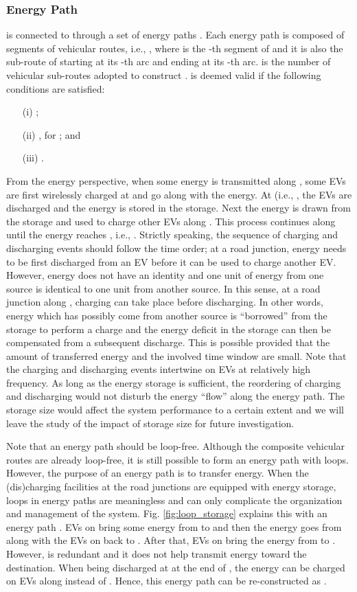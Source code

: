 \documentclass[journal]{IEEEtran}
\begin{document}
\subsubsection{Energy Path}
 is connected to  through a set of energy paths . Each energy path  is composed of  segments of vehicular routes, i.e., , where  is the -th segment of  and it is also the sub-route of  starting at its -th arc and ending at its -th arc.  is  the number of vehicular sub-routes adopted to construct .  is deemed valid if the following conditions are satisfied:
\begin{enumerate}
	\item[(i)] ;
	\item[(ii)] , for  \mbox{}; and
	\item[(iii)] .
\end{enumerate}
From the energy perspective, when some energy is transmitted along , some EVs are first wirelessly charged at  and go along  with the energy. At  (i.e., , the EVs are discharged and the energy is stored in the storage. Next the energy is drawn from the storage and used to charge other EVs along . This process continues along  until the energy reaches , i.e., . Strictly speaking, the sequence of charging and discharging events should follow the time order; at a road junction, energy needs to be first discharged from an EV before it can be used to charge another EV. However, energy does not have an identity and one unit of energy from one source is identical to one unit from another source. In this sense, at a road junction along , charging can take place before discharging. In other words, energy which has possibly come from another source is ``borrowed'' from the storage to perform a charge and the energy deficit in the storage can then be compensated from a subsequent discharge. This is possible provided that the amount of transferred energy and the involved time window are small. Note that the charging and discharging events intertwine on EVs at relatively high frequency. As long as the energy storage is sufficient, the reordering of charging and discharging would not disturb the energy ``flow'' along the energy path. The storage size would affect the system performance to a certain extent and we will leave the study of the impact of storage size for future investigation.

Note that an energy path should be loop-free. Although the composite vehicular routes are already loop-free, it is still possible to form an energy path with loops. However, the purpose of an energy path is to transfer energy. When the (dis)charging facilities at the road junctions are equipped with energy storage, loops in energy paths are meaningless and can only complicate  the organization and management of the system. Fig. \ref{fig:loop_storage} explains this with an energy path . EVs on  bring some energy from  to  and then the energy goes from  along with the EVs on  back to . After that, EVs on  bring the energy from  to . However,  is redundant and it does not help transmit energy toward the destination. When being discharged at  at the end of , the energy can be charged on EVs along  instead of . Hence, this energy path can be re-constructed as .
\end{document}
